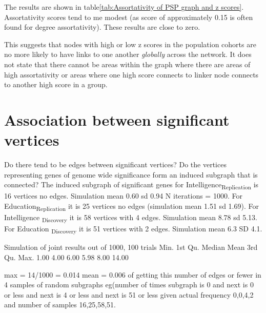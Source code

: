 The results are shown in table\ref{tab:Assortativity of PSP graph and z scores}. Assortativity scores tend to me modest (as score of approximately 0.15 is often found for degree assortativity). These results are close to zero. 

This suggests that nodes with high or low z scores in the population cohorts are no more likely to have links to one another \textit{globally} across the network. It does not state that there cannot be areas within the graph where there are areas of high assortativity or areas where one high score connects to linker node connects to another high score in a group.

\section{Association between significant vertices}
Do there tend to be edges between significant vertices? Do the vertices representing genes of genome wide significance form an induced subgraph that is connected?
The induced subgraph of significant genes for Intelligence\textsubscript{Replication} is 16 vertices no edges. Simulation mean 0.60 sd 0.94 N iterations = 1000. For Education\textsubscript{Replication} it is 25 vertices no edges (simulation mean 1.51 sd 1.69). For Intelligence \textsubscript{Discovery} it is 58 vertices with 4 edges. Simulation mean 8.78 sd 5.13. For Education \textsubscript{Discovery} it is 51 vertices with 2 edges. Simulation mean 6.3 SD 4.1.

Simulation of joint results out of 1000, 100 trials
Min. 1st Qu.  Median    Mean 3rd Qu.    Max. 
   1.00    4.00    6.00    5.98    8.00   14.00 
   
   max = 14/1000 = 0.014
   mean = 0.006 of getting this number of edges or fewer in 4 samples of random subgraphs eg(number of times subgraph is 0 and next is 0 or less and next is 4 or less and next is 51 or less given actual frequency 0,0,4,2 and number of samples 16,25,58,51.
   
 


 
 

